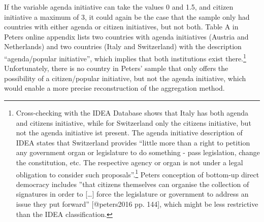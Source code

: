 \documentclass[]{article}
\let\rmarkdownfootnote\footnote%
\def\footnote{\protect\rmarkdownfootnote}
\begin{document}
If the variable agenda initiative can take the values 0 and 1.5, and
citizen initiative a maximum of 3, it could again be the case that the
sample only had countries with either agenda or citizen initiatives, but
not both. Table A in Peters online appendix lists two countries with
agenda initiatives (Austria and Netherlands) and two countries (Italy
and Switzerland) with the description ``agenda/popular initiative'',
which implies that both institutions exist there.\footnote{Cross-checking
  with the IDEA Database shows that Italy has both agenda and citizens
  initiative, while for Switzerland only the citizens initiative, but
  not the agenda initiative ist present. The agenda initiative
  description of IDEA states that Switzerland provides ``little more
  than a right to petition any government organ or legislature to do
  something - pass legislation, change the constitution, etc. The
  respective agency or organ is not under a legal obligation to consider
  such proposals''.\footnote{see:
    \url{https://www.idea.int/node/205203})} Peters conception of
  bottom-up direct democracy includes ''that citizens themselves can
  organise the collection of signatures in order to {[}\ldots{}{]} force
  the legislature or government to address an issue they put forward''
  {[}@peters2016 pp. 144{]}, which might be less restrictive than the
  IDEA classification.} Unfortunately, there is no country in Peters'
sample that only offers the possibility of a citizen/popular initiative,
but not the agenda initiative, which would enable a more precise
reconstruction of the aggregation method.
\end{document}
